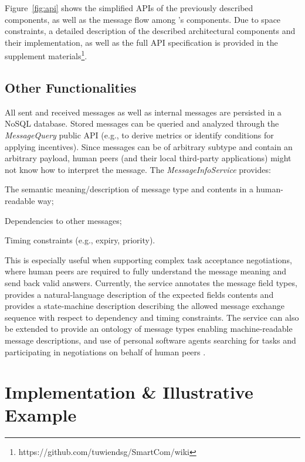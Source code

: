     Figure~\ref{fig:api} shows the simplified APIs of the previously described components, as well as the message flow among \mdl's components.
    Due to space constraints, a detailed description of the described architectural components and their implementation, as well as the full API specification is provided in the supplement materials\footnote{https://github.com/tuwiendsg/SmartCom/wiki}.\addtocounter{footnote}{-1}

  \subsection{Other Functionalities}
  \label{sec:middleware:other}

    All sent and received messages as well as internal messages are persisted in a NoSQL database. Stored messages can be queried and analyzed through the \emph{MessageQuery} public API (e.g., to derive metrics or identify conditions for applying incentives).
    Since messages can be of arbitrary subtype and contain an arbitrary payload, human peers (and their local third-party applications) might not know how to interpret the message. The \emph{MessageInfoService} provides:
    \begin{inparaenum}[\itshape a)]
        \item The semantic meaning/description of message type and contents in a human-readable way; 
        \item Dependencies to other messages;
        \item Timing constraints (e.g., expiry, priority).
    \end{inparaenum}
    This is especially useful when supporting complex task acceptance negotiations, where human peers are required to fully understand the message meaning and send back valid answers. 
    Currently, the service annotates the message field types, provides a natural-language description of the expected fields contents and provides a state-machine description describing the allowed message exchange sequence with respect to dependency and timing constraints. The service can also be extended to provide an ontology of message types enabling machine-readable message descriptions, and use of personal software agents searching for tasks and participating in negotiations on behalf of human peers \cite{KobiGal}. 

    
 
      
\section{Implementation \& Illustrative Example}
\label{sec:impl}

